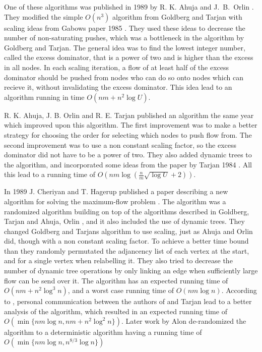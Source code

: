 One of these algorithms was published in 1989 by R. K. Ahuja and J.~B.~Orlin \cite{AO1989}. 
They modified the simple $O(n^3)$ algorithm from Goldberg and Tarjan \cite{Goldberg1988} with scaling ideas from Gabows paper 1985 \cite{Gabow1985}.
They used these ideas to decrease the number of non-saturating pushes, which was a bottleneck in the algorithm by Goldberg and Tarjan.
The general idea was to find the lowest integer number, called the excess dominator, that is a power of two and is higher than the excess in all nodes. 
In each scaling iteration, a flow of at least half of the excess dominator should be pushed from nodes who can do so onto nodes which
can recieve it, without invalidating the excess dominator. This idea lead to an algorithm running in time $O(nm+n^2\log{U})$.

R. K. Ahuja, J. B. Orlin and R. E. Tarjan published an algorithm the same year \cite{AOT1989} which improved upon this algorithm.
The first improvement was to make a better strategy for choosing the order for selecting which nodes to push flow from.
The second improvement was to use a non constant scaling factor, so the excess dominator did not have to be a power of two.
They also added dynamic trees to the algorithm, and incorporated some ideas from the paper by Tarjan 1984 \cite{Tarjan1984}.
All this lead to a running time of $O(nm\log{\left(\frac{n}{m}\sqrt{{\log{U}}}+2\right)})$.

In 1989 J. Cheriyan and T. Hagerup published a paper describing a new algorithm for solving the maximum-flow problem \cite{Cheriyan1989}.
The algorithm was a randomized algorithm building on top of the algorithms described in
Goldberg, Tarjan \cite{Goldberg1988} and Ahuja, Orlin \cite{AO1989}, and it also included the use of dynamic trees. 
They changed Goldberg and Tarjans algorithm to use scaling, just as Ahuja and Orlin \cite{AO1989} did,
though with a non constant scaling factor. To achieve a better time bound than \cite{Goldberg1988}
they randomly permutated the adjancency list of each vertex at the start, and for a single vertex when relabelling it.
They also tried to decrease the number of dynamic tree operations by only linking 
an edge when sufficiently large flow can be send over it.
The algorithm has an expected running time of $O(nm+n^2\log^3{n})$, and a worst case running time of $O(nm\log{n})$.
According to \cite{Cheriyan1990}, personal communication between the authors of \cite{Cheriyan1989}
and Tarjan lead to a better analysis of the algorithm, which resulted in an expected running time of $O(\min{\{nm\log{n},nm+n^2\log^2{n}\}})$.
Later work by Alon \cite{Alon1990} de-randomized the algorithm
to a deterministic algorithm having a running time of $O(\min{\{nm\log{n},n^{8/3}\log{n}\}})$


